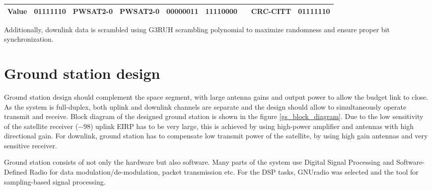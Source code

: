 \begin{table}
\begin{tabular}{l|c|c|c|c|c|c|c|c|}
\hline
\multicolumn{1}{|c|}{Value}                                                    & 01111110               & PWSAT2-0                                                     & PWSAT2-0                                                & 00000011                                              & 11110000                                                     & {\cellcolor[rgb]{0.753,0.753,0.753}}                                                                                                                  & CRC-CITT                                                                         & 01111110               \\
\hline
\end{tabular}
\end{table}


Additionally, downlink data is scrambled using G3RUH scrambling polynomial to maximize randomness and ensure proper bit synchronization.


\chapter{Ground station design}
Ground station design should complement the space segment, with large antenna gains and output power to allow the budget link to close. As the system is full-duplex, both uplink and downlink channels are separate and the design should allow to simultaneously operate transmit and receive. Block diagram of the designed ground station is shown in the figure \ref{gs_block_diagram}.
Due to the low sensitivity of the satellite receiver (\SI{-98}{\dBm}) uplink EIRP has to be very large, this is achieved by using high-power amplifier and antennas with high directional gain. For downlink, ground station has to compensate low transmit power of the satellite, by using high gain antennas and very sensitive receiver.

Ground station consists of not only the hardware but also software. Many parts of the system use Digital Signal Processing and Software-Defined Radio for data modulation/de-modulation, packet transmission etc. For the DSP tasks, GNUradio \cite{gnuradio} was selected and the tool for sampling-based signal processing.



